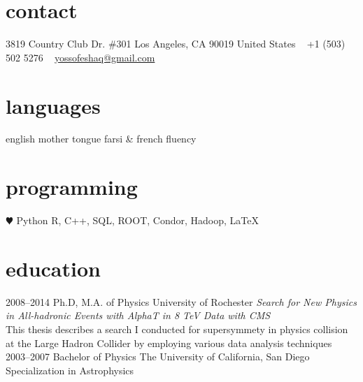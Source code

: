 \documentclass[]{friggeri-cv} %
\begin{document}


\begin{aside} %
\section{contact}
\footnotesize{3819 Country Club Dr. \#301
Los Angeles, CA 90019
United States}
~
+1 (503) 502 5276
~
\href{mailto:yossofeshaq@gmail.com}{yossofeshaq@gmail.com}
\section{languages}
english mother tongue
farsi \& french fluency
\section{programming}
{\color{red} $\varheartsuit$} Python
R, C++, SQL, ROOT, Condor, Hadoop, LaTeX
\end{aside}


\section{education}

\begin{entrylist}
\entry
{2008--2014}
{Ph.D, M.A. {\normalfont of Physics}}
{University of Rochester}
{\emph{Search for New Physics in All-hadronic Events with AlphaT in 8 TeV Data with CMS} \\ This thesis describes a search I conducted for supersymmety in physics collision at the Large Hadron Collider by employing various data analysis techniques}
~~\\
\entry
{2003--2007}
{Bachelor {\normalfont of Physics}}
{The University of California, San Diego}
{Specialization in Astrophysics}
\end{entrylist}
\end{document}
